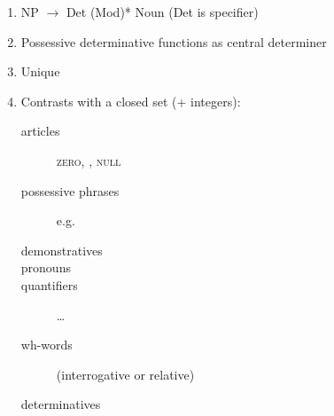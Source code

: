 \documentclass[a4paper,landscape,headrule,footrule,xetex]{foils}
\begin{document}
\begin{enumerate}\addtolength{\itemsep}{-5mm}
\item NP $\rightarrow$ Det (Mod)* Noun \hfill (Det is specifier)
\item Possessive determinative functions as central determiner
\item Unique
\item Contrasts with a closed set (+ integers):
  \begin{description}
  \item[articles] \textsc{zero}, , \textsc{null}

  \item[possessive phrases] e.g. 
  \item[demonstratives] 
  \item[pronouns] 
  \item[quantifiers]  \ldots
  \item[wh-words]  (interrogative or relative)
  \item[determinatives] 
  \end{description}
\end{enumerate}

\end{document}
